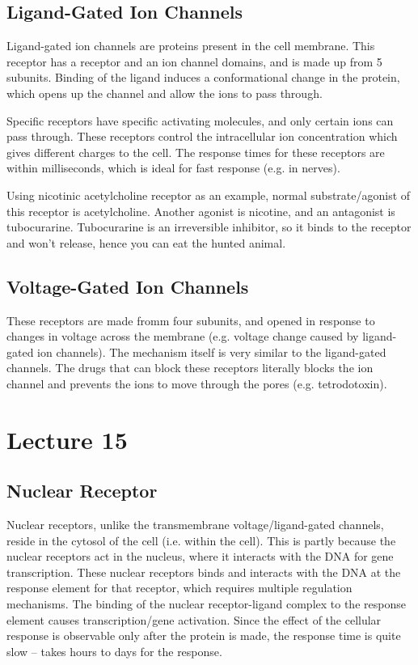 \documentclass[a4paper, 12pt]{report}
\newcommand{\mychapter}[2]{
    \setcounter{chapter}{#1}
    \setcounter{section}{0}
    \chapter*{#2}
    \addcontentsline{toc}{chapter}{#2}
}
\begin{document}
\section{Ligand-Gated Ion Channels}

Ligand-gated ion channels are proteins present in the cell membrane.
This receptor has a receptor and an ion channel domains, and is made up from 5 subunits.
Binding of the ligand induces a conformational change in the protein, which opens up the channel and allow the ions to pass through.

Specific receptors have specific activating molecules, and only certain ions can pass through.
These receptors control the intracellular ion concentration which gives different charges to the cell.
The response times for these receptors are within milliseconds, which is ideal for fast response (e.g. in nerves).

Using nicotinic acetylcholine receptor as an example, normal substrate/agonist of this receptor is acetylcholine.
Another agonist is nicotine, and an antagonist is tubocurarine.
Tubocurarine is an irreversible inhibitor, so it binds to the receptor and won't release, hence you can eat the hunted animal.

\section{Voltage-Gated Ion Channels}

These receptors are made fromm four subunits, and opened in response to changes in voltage across the membrane (e.g. voltage change caused by ligand-gated ion channels).
The mechanism itself is very similar to the ligand-gated channels.
The drugs that can block these receptors literally blocks the ion channel and prevents the ions to move through the pores (e.g. tetrodotoxin).

\mychapter{15}{Lecture 15}

\section{Nuclear Receptor}

Nuclear receptors, unlike the transmembrane voltage/ligand-gated channels, reside in the cytosol of the cell (i.e. within the cell).
This is partly because the nuclear receptors act in the nucleus, where it interacts with the DNA for gene transcription.
These nuclear receptors binds and interacts with the DNA at the response element for that receptor, which requires multiple regulation mechanisms.
The binding of the nuclear receptor-ligand complex to the response element causes transcription/gene activation.
Since the effect of the cellular response is observable only after the protein is made, the response time is quite slow -- takes hours to days for the response.
\end{document}
